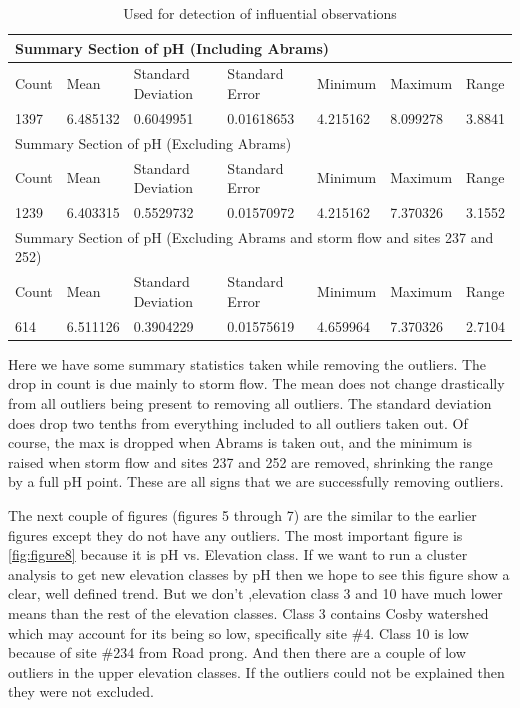 \documentclass[11pt]{article} %
\begin{document}
\begin{table}[htbp]
\caption{Used for detection of influential observations}
\begin{tabular}{lllllll}
\toprule
\multicolumn{7}{l}{Summary Section of pH (Including Abrams)}  \\ 
\midrule
Count & Mean & Standard Deviation & Standard Error & Minimum & Maximum & Range \\ 
1397 & 6.485132 &0.6049951 & 0.01618653 &4.215162 & 8.099278 & 3.8841 \\ 
\midrule
\multicolumn{7}{l}{Summary Section of pH (Excluding Abrams)} \\ 
\midrule
Count & Mean & Standard Deviation & Standard Error & Minimum & Maximum & Range \\ 
1239 & 6.403315 & 0.5529732 & 0.01570972 & 4.215162 & 7.370326 & 3.1552 \\ 
\midrule
\multicolumn{7}{l}{Summary Section of pH (Excluding Abrams and storm flow and sites 237 and 252)}\\ 
\midrule
Count & Mean & Standard Deviation & Standard Error & Minimum & Maximum & Range \\ 
614 & 6.511126 & 0.3904229 & 0.01575619 & 4.659964 &7.370326 & 2.7104 \\ 
\bottomrule
\end{tabular}
\label{Data Summary}
\end{table}


Here we have some summary statistics taken while removing the outliers.  The drop in count is due mainly to storm flow.  The mean does not change drastically from all outliers being present to removing all outliers.  The standard deviation does drop two tenths from everything included to all outliers taken out.  Of course, the max is dropped when Abrams is taken out, and the minimum is raised when storm flow and sites 237 and 252 are removed, shrinking the range by a full pH point.  These are all signs that we are successfully removing outliers. 
    
The next couple of figures (figures 5 through 7) are the similar to the earlier figures except they do not have any outliers.  The most important figure is \autoref{fig:figure8} because it is pH vs. Elevation class.  If we want to run a cluster analysis to get new elevation classes by pH then we hope to see this figure show a clear, well defined trend.  But we don't ,elevation class 3 and 10 have much lower means than the rest of the elevation classes.  Class 3 contains Cosby watershed which may account for its being so low, specifically site $\#$4.  Class 10 is low because of site $\#$234 from Road prong.  And then there are a couple of low outliers in the upper elevation classes.  If the outliers could not be explained then they were not excluded.
\end{document}
